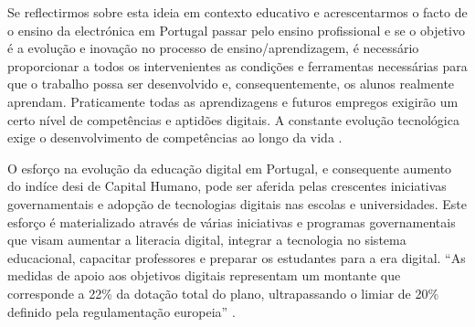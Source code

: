 Se reflectirmos sobre esta ideia em contexto educativo e acrescentarmos o facto de o ensino da electrónica em Portugal passar pelo ensino profissional e se o objetivo é a evolução e inovação no processo de ensino/aprendizagem, é necessário proporcionar a todos os intervenientes as condições e ferramentas necessárias para que o trabalho possa ser desenvolvido e, consequentemente, os alunos realmente aprendam. Praticamente todas as aprendizagens e futuros empregos exigirão um certo nível de competências e aptidões digitais. A constante evolução tecnológica exige o desenvolvimento de competências ao longo da vida \cite{Digitale13:online}.

O esforço na evolução da educação digital em Portugal, e consequente aumento do indíce \acrshort{desi} de Capital Humano,  pode ser aferida pelas crescentes iniciativas governamentais e adopção de tecnologias digitais nas escolas e universidades. Este esforço é materializado através de várias iniciativas e programas governamentais que visam aumentar a literacia digital, integrar a tecnologia no sistema educacional, capacitar professores e preparar os estudantes para a era digital. ``As medidas de apoio aos objetivos digitais representam um montante que corresponde a 22\% da dotação total do plano, ultrapassando o limiar de 20\% definido pela regulamentação europeia'' \cite{Transicaodigitalprr}.

